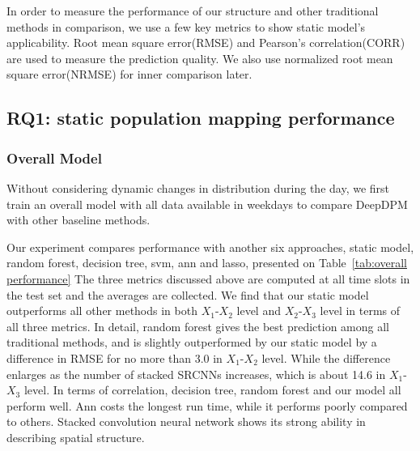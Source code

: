 \documentclass[letterpaper]{article} %
\begin{document}
In order to measure the performance of our structure and other traditional methods in comparison, we use a few key metrics to show static model's applicability. Root mean square error(RMSE) and Pearson's correlation(CORR) are used to measure the prediction quality. We also use normalized root mean square error(NRMSE) for inner comparison later. 



\subsection{RQ1: static population mapping performance}
\subsubsection{Overall Model}
Without considering dynamic changes in distribution during the day, we first train an overall model with all data available in weekdays to compare DeepDPM with other baseline methods. 

Our experiment compares performance with another six approaches, static model, random forest, decision tree, svm, ann and lasso, presented on Table~\ref{tab:overall performance} The three metrics discussed above are computed at all time slots in the test set and the averages are collected. We find that our static model outperforms all other methods in both $X_1$-$X_2$ level and $X_2$-$X_3$ level in terms of all three metrics. In detail, random forest gives the best prediction among all traditional methods, and is slightly outperformed by our static model by a difference in RMSE for no more than 3.0 in $X_1$-$X_2$ level. While the difference enlarges as the number of stacked SRCNNs increases, which is about 14.6 in $X_1$-$X_3$ level. In terms of correlation, decision tree, random forest and our model all perform well. Ann costs the longest run time, while it performs poorly compared to others. Stacked convolution neural network shows its strong ability in describing spatial structure.
\end{document}
